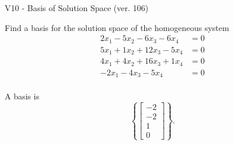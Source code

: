 \begin{exercise}
  \begin{exerciseTitle}V10 - Basis of Solution Space (ver. 106)\end{exerciseTitle}
  \begin{exerciseStatement}
    Find a basis for the solution space of the homogeneous system 
\begin{align*}
 2 x_ 1 -5 x_ 2 -6 x_ 3 -6 x_ 4 &= 0  \\ 
  5 x_ 1 + 1 x_ 2 + 12 x_ 3 -5 x_ 4 &= 0  \\ 
  4 x_ 1 + 4 x_ 2 + 16 x_ 3 + 1 x_ 4 &= 0  \\ 
  -2 x_ 1 -4 x_ 3 -5 x_ 4 &= 0  \\ 
 \end{align*}


 
  \end{exerciseStatement}

  \begin{exerciseAnswer}
   A basis is   
\[\left\{\left[\begin{array}{c}
-2 \\
-2 \\
1 \\
0
\end{array}\right]\right\}.\]

  


  \end{exerciseAnswer}
\end{exercise}